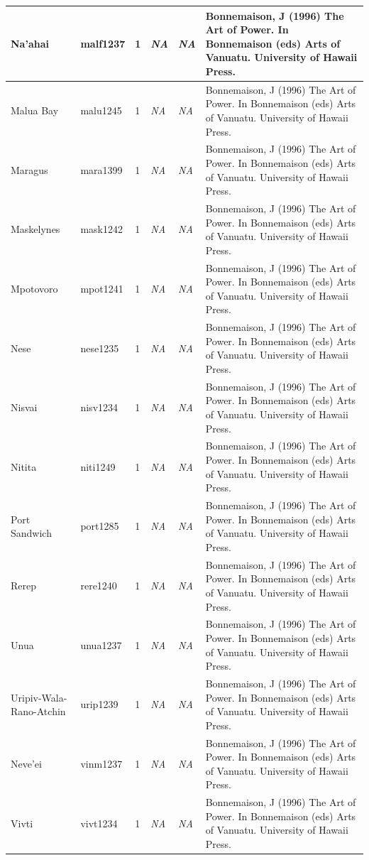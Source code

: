 \documentclass[a4paper,10pt]{article} %
\begin{document}
\begin{landscape}
\begin{longtable}{ | p{2cm}| p{2cm}| p{1.8cm}| p{1.8cm}| p{3cm}| p{9cm}| }
Na'ahai&malf1237&1&\emph{NA}&\emph{NA}&Bonnemaison, J (1996) The Art of Power. In Bonnemaison (eds) Arts of Vanuatu. University of Hawaii Press.\\ \hline
Malua Bay&malu1245&1&\emph{NA}&\emph{NA}&Bonnemaison, J (1996) The Art of Power. In Bonnemaison (eds) Arts of Vanuatu. University of Hawaii Press.\\ \hline
Maragus&mara1399&1&\emph{NA}&\emph{NA}&Bonnemaison, J (1996) The Art of Power. In Bonnemaison (eds) Arts of Vanuatu. University of Hawaii Press.\\ \hline
Maskelynes&mask1242&1&\emph{NA}&\emph{NA}&Bonnemaison, J (1996) The Art of Power. In Bonnemaison (eds) Arts of Vanuatu. University of Hawaii Press.\\ \hline
Mpotovoro&mpot1241&1&\emph{NA}&\emph{NA}&Bonnemaison, J (1996) The Art of Power. In Bonnemaison (eds) Arts of Vanuatu. University of Hawaii Press.\\ \hline
Nese&nese1235&1&\emph{NA}&\emph{NA}&Bonnemaison, J (1996) The Art of Power. In Bonnemaison (eds) Arts of Vanuatu. University of Hawaii Press.\\ \hline
Nisvai&nisv1234&1&\emph{NA}&\emph{NA}&Bonnemaison, J (1996) The Art of Power. In Bonnemaison (eds) Arts of Vanuatu. University of Hawaii Press.\\ \hline
Nitita&niti1249&1&\emph{NA}&\emph{NA}&Bonnemaison, J (1996) The Art of Power. In Bonnemaison (eds) Arts of Vanuatu. University of Hawaii Press.\\ \hline
Port Sandwich&port1285&1&\emph{NA}&\emph{NA}&Bonnemaison, J (1996) The Art of Power. In Bonnemaison (eds) Arts of Vanuatu. University of Hawaii Press.\\ \hline
Rerep&rere1240&1&\emph{NA}&\emph{NA}&Bonnemaison, J (1996) The Art of Power. In Bonnemaison (eds) Arts of Vanuatu. University of Hawaii Press.\\ \hline
Unua&unua1237&1&\emph{NA}&\emph{NA}&Bonnemaison, J (1996) The Art of Power. In Bonnemaison (eds) Arts of Vanuatu. University of Hawaii Press.\\ \hline
Uripiv-Wala-Rano-Atchin&urip1239&1&\emph{NA}&\emph{NA}&Bonnemaison, J (1996) The Art of Power. In Bonnemaison (eds) Arts of Vanuatu. University of Hawaii Press.\\ \hline
Neve'ei&vinm1237&1&\emph{NA}&\emph{NA}&Bonnemaison, J (1996) The Art of Power. In Bonnemaison (eds) Arts of Vanuatu. University of Hawaii Press.\\ \hline
Vivti&vivt1234&1&\emph{NA}&\emph{NA}&Bonnemaison, J (1996) The Art of Power. In Bonnemaison (eds) Arts of Vanuatu. University of Hawaii Press.\\ \hline

\end{longtable}
\end{landscape}
\end{document}
